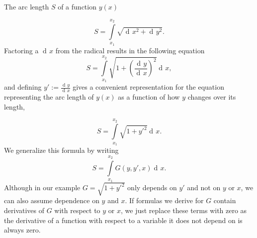 \documentclass[prb,preprint]{revtex4-1}
\DeclareMathOperator{\dd}{d\!}
\begin{document}
The arc length $S$ of a function $y(x)$


\begin{equation}
S=\int\limits_{x_1}^{x_2}\sqrt{\dd x^2 + \dd y^2}.
\end{equation}
Factoring a $\dd x$ from the radical results in the following equation
\begin{equation}
S= \int\limits_{x_1}^{x_2}\sqrt{1 + \left(\frac{\dd y}{\dd x}\right)^2} \dd x,
\end{equation}
and defining $y' := \frac{\dd y}{\dd x}$ gives a convenient representation for the equation representing the arc length of $y(x)$ as a function of how $y$ changes over its length, %

\begin{equation}
S = \int\limits_{x_1}^{x_2}\sqrt{1 + y'^2} \dd x.
\end{equation}
We generalize this formula by writing
\begin{equation}
S=\int\limits_{x_1}^{x_2} G(y,y',x) \dd x .
\end{equation}
Although in our example $G = \sqrt{1 + y'^2}$ only depends on $y'$ and not on $y$ or $x$, we can also assume dependence on $y$ and $x$. %
If formulas we derive for $G$ contain derivatives of $G$ with respect to $y$ or $x$, we just replace these terms with zero as the derivative of a function with respect to a variable it does not depend on is always zero.

\end{document}
